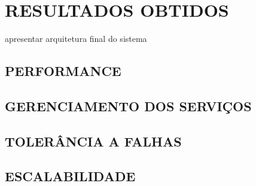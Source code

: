\chapter{RESULTADOS OBTIDOS}
\label{chp:resultados}

apresentar arquitetura final do sistema

\section{PERFORMANCE}

\section{GERENCIAMENTO DOS SERVIÇOS}

\section{TOLERÂNCIA A FALHAS}

\section{ESCALABILIDADE}
